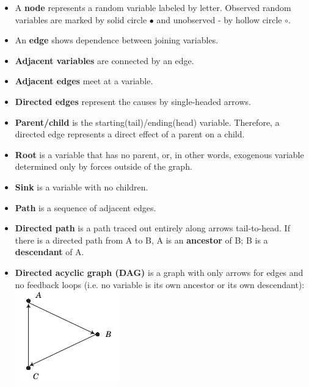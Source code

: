 \begin{itemize}

\item A \textbf{node} represents a random variable labeled by letter. Observed random variables are marked by solid circle $\bullet$ and unobserved - by hollow circle \( \circ \).

\item An \textbf{edge} shows dependence between joining variables.

\item \textbf{Adjacent variables} are connected by an edge.

\item \textbf{Adjacent edges} meet at a variable.

\item \textbf{Directed edges} represent the causes by single-headed arrows.

\item \textbf{Parent/child} is the starting(tail)/ending(head) variable. Therefore, a directed edge represents a direct effect of a parent on a child.

\item \textbf{Root} is a variable that has no parent, or, in other words, exogenous variable determined only by forces outside of the graph.

\item \textbf{Sink} is a variable with no children.

\item \textbf{Path} is a sequence of adjacent edges.

\item \textbf{Directed path} is a path traced out entirely along arrows tail-to-head. If there is a directed path from A to B,  A is an \textbf{ancestor} of B; B is a  \textbf{descendant} of A.\\

\item \textbf{Directed acyclic graph (DAG)} is a graph with only arrows for edges and no feedback loops (i.e. no variable is its own ancestor or its own descendant):\\

\includegraphics[trim=0 0 0 -1cm, center]{../material/fig-graph-with-cycle.png}


\end{itemize}
